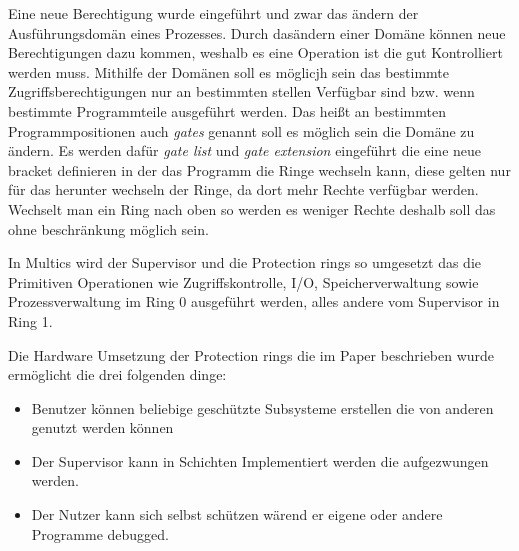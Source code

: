\documentclass[11pt,technote]{IEEEtran}
\begin{document}
        Eine neue Berechtigung wurde eingef\"uhrt und zwar das \"andern der Ausf\"uhrungsdom\"an eines Prozesses.
        Durch das\"andern einer Dom\"ane k\"onnen neue Berechtigungen dazu kommen, weshalb es eine Operation ist die gut Kontrolliert werden muss.
        Mithilfe der Dom\"anen soll es m\"oglicjh sein das bestimmte Zugriffsberechtigungen nur an bestimmten stellen Verf\"ugbar  sind bzw. wenn bestimmte Programmteile 
        ausgef\"uhrt werden. Das hei\ss t an bestimmten Programmpositionen auch \textit{gates} genannt soll es m\"oglich sein die Dom\"ane zu \"andern.
        Es werden daf\"ur \textit{gate list} und \textit{gate extension} eingef\"uhrt die eine neue bracket definieren in der das Programm die Ringe wechseln kann, diese
        gelten nur f\"ur das herunter wechseln der Ringe, da dort mehr Rechte verf\"ugbar werden. Wechselt man ein Ring nach oben so werden es weniger Rechte deshalb
        soll das ohne beschr\"ankung m\"oglich sein. 
    
    
        In Multics wird der Supervisor und die Protection rings so umgesetzt das die Primitiven Operationen wie Zugriffskontrolle, I/O, Speicherverwaltung sowie
        Prozessverwaltung im Ring 0 ausgef\"uhrt werden, alles andere vom Supervisor in Ring 1.
    
        Die Hardware Umsetzung der Protection rings die im Paper \cite{inproc:protec-rings} beschrieben wurde erm\"oglicht die drei folgenden dinge:
		    \begin{itemize}
		      \item Benutzer k\"onnen beliebige gesch\"utzte Subsysteme erstellen die von anderen genutzt werden k\"onnen
		      \item Der Supervisor kann in Schichten Implementiert werden die aufgezwungen werden.
		      \item Der Nutzer kann sich selbst sch\"utzen w\"arend er eigene oder andere Programme debugged.
		    \end{itemize}
    
\end{document}
